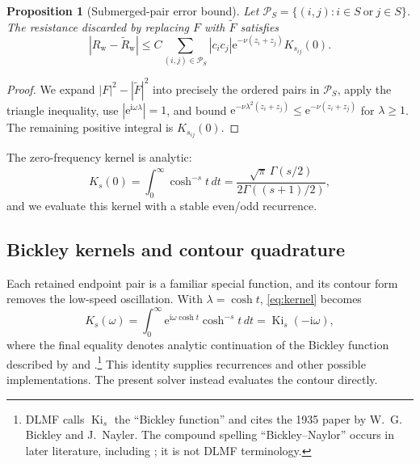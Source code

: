 \documentclass[10pt]{article}
\newtheorem{proposition}{Proposition}
\newcommand{\Ki}{\operatorname{Ki}}
\newcommand{\iu}{\mathrm{i}}
\newcommand{\e}{\mathrm{e}}
\newcommand{\Rw}{R_{\mathrm{w}}}
\begin{document}
\begin{proposition}[Submerged-pair error bound]
Let \(\mathcal P_S=\{(i,j):i\in S\ \text{or}\ j\in S\}\).  The resistance
discarded by replacing \(F\) with \(\widetilde F\) satisfies
\begin{equation}
 \left|\Rw-\widetilde R_{\mathrm w}\right|
 \leq C\sum_{(i,j)\in\mathcal P_S}
 |c_i c_j|\e^{-\nu(z_i+z_j)}K_{s_{ij}}(0).
 \label{eq:omitbound}
\end{equation}
\end{proposition}

\begin{proof}
We expand \(|F|^2-|\widetilde F|^2\) into precisely the ordered pairs in
\(\mathcal P_S\), apply the triangle inequality, use
\(|\e^{\iu\omega\lambda}|=1\), and bound
\(\e^{-\nu\lambda^2(z_i+z_j)}\leq\e^{-\nu(z_i+z_j)}\) for
\(\lambda\geq1\).  The remaining positive integral is \(K_{s_{ij}}(0)\).
\end{proof}

The zero-frequency kernel is analytic:
\begin{equation}
 K_s(0)=\int_0^\infty\cosh^{-s}t\,dt
 = \frac{\sqrt\pi\,\Gamma(s/2)}{2\Gamma((s+1)/2)},
 \label{eq:kzero}
\end{equation}
and we evaluate this kernel with a stable even/odd recurrence.

\subsection{Bickley kernels and contour quadrature}
\label{sec:contour}

Each retained endpoint pair is a familiar special function, and its contour
form removes the low-speed oscillation.  With \(\lambda=\cosh t\),
\cref{eq:kernel} becomes
\begin{equation}
 K_s(\omega)=\int_0^\infty
 \e^{\iu\omega\cosh t}\cosh^{-s}t\,dt
 =\Ki_s(-\iu\omega),
 \label{eq:bickley}
\end{equation}
where the final equality denotes analytic continuation of the Bickley
function described by \citet{BickleyNayler1935} and
\citet{DLMF1043}.\footnote{DLMF calls
\(\Ki_s\) the ``Bickley function'' and cites the 1935 paper by W.~G. Bickley
and J.~Nayler.  The compound spelling ``Bickley--Naylor'' occurs in later
literature, including \citet{RuffaToni2026}; it is not DLMF terminology.}
This identity supplies recurrences and other possible implementations.  The
present solver instead evaluates the contour directly.
\end{document}
